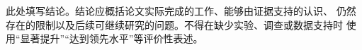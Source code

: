 \yibinclosingchapter

此处填写结论。结论应概括论文实际完成的工作、能够由证据支持的认识、
仍然存在的限制以及后续可继续研究的问题。不得在缺少实验、调查或数据支持时
使用“显著提升”“达到领先水平”等评价性表述。
